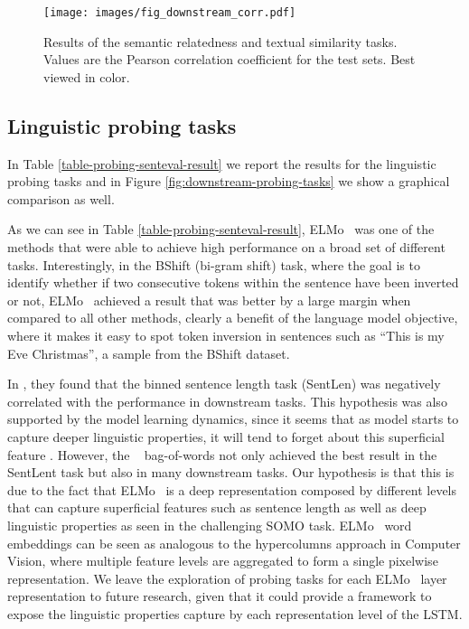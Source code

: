 \documentclass{article}
\begin{document}
\begin{figure}[!htb]
 \texttt{[image: images/fig\_downstream\_corr.pdf]}
\caption{Results of the semantic relatedness and textual similarity tasks. Values are the Pearson correlation coefficient for the test sets. Best viewed in color.}
\label{fig:downstream-correlations-tasks}
\end{figure}


\subsection{Linguistic probing tasks}
In Table \ref{table-probing-senteval-result} we report the results for the linguistic probing tasks and in Figure \ref{fig:downstream-probing-tasks} we show a graphical comparison as well.

As we can see in Table \ref{table-probing-senteval-result}, ELMo~\cite{peters2018deep} was one of the methods that were able to achieve high performance on a broad set of different tasks. Interestingly, in the BShift (bi-gram shift) task, where the goal is to identify whether if two consecutive tokens within the sentence have been inverted or not, ELMo~\cite{peters2018deep} achieved a result that was better by a large margin when compared to all other methods, clearly a benefit of the language model objective, where it makes it easy to spot token inversion in sentences such as ``This is my Eve Christmas'', a sample from the BShift dataset.

In \cite{conneau2018you}, they found that the binned sentence length task (SentLen) was negatively correlated with the performance in downstream tasks. This hypothesis was also supported by the model learning dynamics, since it seems that as model starts to capture deeper linguistic
properties, it will tend to forget about this superficial feature \cite{conneau2018you}. However, the ~\cite{peters2018deep} bag-of-words not only achieved the best result in the SentLent task but also in many downstream tasks. Our hypothesis is that this is due to the fact that ELMo~\cite{peters2018deep} is a deep representation composed by different levels that can capture superficial features such as sentence length as well as deep linguistic properties as seen in the challenging SOMO task. ELMo~\cite{peters2018deep} word embeddings can be seen as analogous to the hypercolumns \cite{BharathCVPR2015} approach in Computer Vision, where multiple feature levels are aggregated to form a single pixelwise representation. We leave the exploration of probing tasks for each ELMo~\cite{peters2018deep} layer representation to future research, given that it could provide a framework to expose the linguistic properties capture by each representation level of the LSTM.
\end{document}
